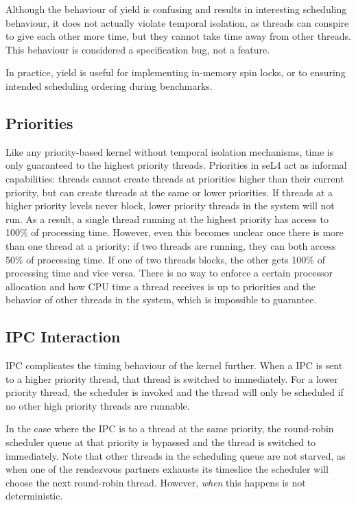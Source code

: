 Although the behaviour of yield is confusing and results in interesting scheduling behaviour, it does not actually violate temporal isolation, as threads can conspire to give each other more time, but they cannot take time away from other threads.
This behaviour is considered a specification bug, not a feature. 

In practice, yield is useful for implementing in-memory spin locks, or to ensuring intended scheduling ordering during benchmarks.

\subsection{Priorities}

Like any priority-based kernel without temporal isolation mechanisms, time is only guaranteed to the highest priority threads.
Priorities in seL4 act as informal capabilities: threads cannot create threads at priorities higher than their current priority, but can create threads at the same or lower priorities.
If threads at a higher priority levels never block, lower priority threads in the system will not run.
As a result, a single thread running at the highest priority has access to 100\% of processing time.
However, even this becomes unclear once there is more than one thread at a priority: if two threads are running, they can both access 50\% of processing time.
If one of two threads blocks, the other gets 100\% of processing time and vice versa.
There is no way to enforce a certain processor allocation and how CPU time a thread receives is up to priorities and the behavior of other threads in the system, which is impossible to guarantee.

\subsection{IPC Interaction}

\gls{IPC} complicates the timing behaviour of the kernel further.
When a \gls{IPC} is sent to a higher priority thread, that thread is switched to immediately.
For a lower priority thread, the scheduler is invoked and the thread will only be scheduled if no other high priority threads are runnable.

In the case where the \gls{IPC} is to a thread at the same priority, the round-robin scheduler queue at that priority is bypassed and the thread is switched to immediately.
Note that other threads in the scheduling queue are not starved, as when one of the rendezvous partners exhausts its timeslice the scheduler will choose the next round-robin thread.
However, \textit{when} this happens is not deterministic.

